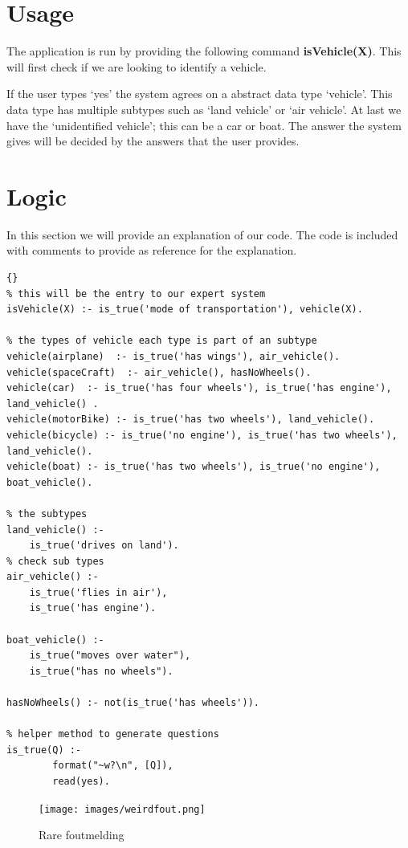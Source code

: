 \section{Usage} \label{man-usage}
The application is run by providing the following command \textbf{isVehicle(X)}.
This will first check if we are looking to identify a vehicle.

If the user types `yes' the system agrees on a abstract data type `vehicle'.
This data type has multiple subtypes such as `land vehicle' or `air vehicle'.
At last we have the `unidentified vehicle'; this can be a car or boat.
The answer the system gives will be decided by the answers that the user provides.

\newpage
\section{Logic} \label{man-logic}
In this section we will provide an explanation of our code.
The code is included with comments to provide as reference for the explanation.

\begin{lstlisting}{}
% this will be the entry to our expert system
isVehicle(X) :- is_true('mode of transportation'), vehicle(X).

% the types of vehicle each type is part of an subtype
vehicle(airplane)  :- is_true('has wings'), air_vehicle().
vehicle(spaceCraft)  :- air_vehicle(), hasNoWheels().
vehicle(car)  :- is_true('has four wheels'), is_true('has engine'), land_vehicle() .
vehicle(motorBike) :- is_true('has two wheels'), land_vehicle().
vehicle(bicycle) :- is_true('no engine'), is_true('has two wheels'), land_vehicle().
vehicle(boat) :- is_true('has two wheels'), is_true('no engine'), boat_vehicle().

% the subtypes
land_vehicle() :-
	is_true('drives on land').
% check sub types
air_vehicle() :-
	is_true('flies in air'),
	is_true('has engine').

boat_vehicle() :-
	is_true("moves over water"),
    is_true("has no wheels").

hasNoWheels() :- not(is_true('has wheels')).

% helper method to generate questions
is_true(Q) :-
        format("~w?\n", [Q]),
        read(yes).
\end{lstlisting}

\begin{figure}[!h]
  \centering
  \texttt{[image: images/weirdfout.png]}
  \caption{Rare foutmelding}
  \label{fig:rareFout}
\end{figure}{}


